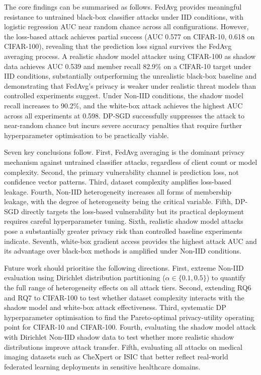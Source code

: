 \documentclass[12pt, a4paper]{report}
\begin{document}
The core findings can be summarised as follows. FedAvg provides meaningful
resistance to untrained black-box classifier attacks under IID conditions, with
logistic regression AUC near random chance across all configurations. However,
the loss-based attack achieves partial success (AUC 0.577 on CIFAR-10, 0.618
on CIFAR-100), revealing that the prediction loss signal survives the FedAvg
averaging process. A realistic shadow model attacker using CIFAR-100 as shadow
data achieves AUC 0.539 and member recall 82.9\% on a CIFAR-10 target under
IID conditions, substantially outperforming the unrealistic black-box baseline
and demonstrating that FedAvg's privacy is weaker under realistic threat models
than controlled experiments suggest. Under Non-IID conditions, the shadow model
recall increases to 90.2\%, and the white-box attack achieves the highest AUC
across all experiments at 0.598. DP-SGD successfully suppresses the attack to
near-random chance but incurs severe accuracy penalties that require further
hyperparameter optimisation to be practically viable.

Seven key conclusions follow. First, FedAvg averaging is the dominant privacy
mechanism against untrained classifier attacks, regardless of client count or
model complexity. Second, the primary vulnerability channel is prediction loss,
not confidence vector patterns. Third, dataset complexity amplifies loss-based
leakage. Fourth, Non-IID heterogeneity increases all forms of membership leakage,
with the degree of heterogeneity being the critical variable. Fifth, DP-SGD
directly targets the loss-based vulnerability but its practical deployment requires
careful hyperparameter tuning. Sixth, realistic shadow model attacks pose a
substantially greater privacy risk than controlled baseline experiments indicate.
Seventh, white-box gradient access provides the highest attack AUC and its
advantage over black-box methods is amplified under Non-IID conditions.

Future work should prioritise the following directions. First, extreme Non-IID
evaluation using Dirichlet distribution partitioning ($\alpha \in \{0.1, 0.5\}$)
to quantify the full range of heterogeneity effects on all attack tiers. Second,
extending RQ6 and RQ7 to CIFAR-100 to test whether dataset complexity interacts
with the shadow model and white-box attack effectiveness. Third, systematic DP
hyperparameter optimisation to find the Pareto-optimal privacy-utility operating
point for CIFAR-10 and CIFAR-100. Fourth, evaluating the shadow model attack
with Dirichlet Non-IID shadow data to test whether more realistic shadow
distributions improve attack transfer. Fifth, evaluating all attacks on medical
imaging datasets such as CheXpert or ISIC that better reflect real-world federated
learning deployments in sensitive healthcare domains.
\end{document}
